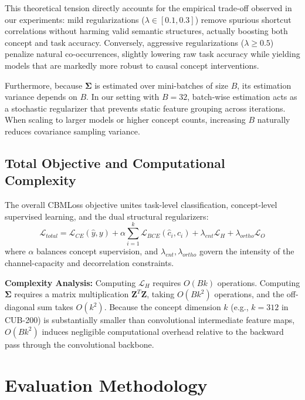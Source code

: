 \documentclass[times,twocolumn,final]{elsarticle}
\begin{document}
This theoretical tension directly accounts for the empirical trade-off observed in our experiments: mild regularizations ($\lambda \in [0.1, 0.3]$) remove spurious shortcut correlations without harming valid semantic structures, actually boosting both concept and task accuracy. Conversely, aggressive regularizations ($\lambda \ge 0.5$) penalize natural co-occurrences, slightly lowering raw task accuracy while yielding models that are markedly more robust to causal concept interventions.

Furthermore, because $\boldsymbol{\Sigma}$ is estimated over mini-batches of size $B$, its estimation variance depends on $B$. In our setting with $B=32$, batch-wise estimation acts as a stochastic regularizer that prevents static feature grouping across iterations. When scaling to larger models or higher concept counts, increasing $B$ naturally reduces covariance sampling variance.

\subsection{Total Objective and Computational Complexity}
The overall CBMLoss objective unites task-level classification, concept-level supervised learning, and the dual structural regularizers:
\begin{equation}
    \mathcal{L}_{total} = \mathcal{L}_{CE}(\hat{y}, y) + \alpha \sum_{i=1}^k \mathcal{L}_{BCE}(\hat{c}_i, c_i) + \lambda_{ent} \mathcal{L}_{H} + \lambda_{ortho} \mathcal{L}_{O}
\end{equation}
where $\alpha$ balances concept supervision, and $\lambda_{ent}, \lambda_{ortho}$ govern the intensity of the channel-capacity and decorrelation constraints.

\noindent\textbf{Complexity Analysis:} Computing $\mathcal{L}_{H}$ requires $O(Bk)$ operations. Computing $\boldsymbol{\Sigma}$ requires a matrix multiplication $\boldsymbol{Z}^T \boldsymbol{Z}$, taking $O(B k^2)$ operations, and the off-diagonal sum takes $O(k^2)$. Because the concept dimension $k$ (e.g., $k=312$ in CUB-200) is substantially smaller than convolutional intermediate feature maps, $O(Bk^2)$ induces negligible computational overhead relative to the backward pass through the convolutional backbone.

\section{Evaluation Methodology}
\label{sec:eval}
\end{document}
